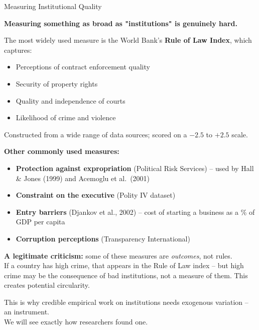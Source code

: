\documentclass[10pt]{beamer}
\begin{document}
\begin{frame}[allowframebreaks]{Measuring Institutional Quality}

\textbf{Measuring something as broad as "institutions" is genuinely hard.}


The most widely used measure is the World Bank's \textbf{Rule of Law Index}, which captures:
\begin{itemize}
\item Perceptions of contract enforcement quality
\item Security of property rights
\item Quality and independence of courts
\item Likelihood of crime and violence
\end{itemize}
Constructed from a wide range of data sources; scored on a $-2.5$ to $+2.5$ scale.


\textbf{Other commonly used measures:}
\begin{itemize}
\item \textbf{Protection against expropriation} (Political Risk Services) -- used by Hall \& Jones (1999) and Acemoglu et al.\ (2001)
\item \textbf{Constraint on the executive} (Polity IV dataset)
\item \textbf{Entry barriers} (Djankov et al., 2002) -- cost of starting a business as a \% of GDP per capita
\item \textbf{Corruption perceptions} (Transparency International)
\end{itemize}


\textbf{A legitimate criticism:} some of these measures are \emph{outcomes}, not rules. \\
If a country has high crime, that appears in the Rule of Law index -- but high crime may be the consequence of bad institutions, not a measure of them.
This creates potential circularity.


\alert{This is why credible empirical work on institutions needs exogenous variation -- an instrument.}\\[4pt]
We will see exactly how researchers found one.
\end{frame}
\end{document}
